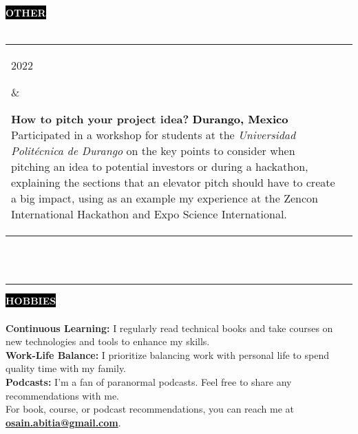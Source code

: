 \documentclass[10pt,A4]{article}
\makeatletter
\newcounter{a}
\newcounter{b}
\newcounter{c}
\newcommand{\cvsection}[1] {
	\textcolor{white}{\MakeUppercase{\textbf{#1}}}
}
\newcommand{\cvsect}[1]{
	\colorbox{black}{{\cvsection{#1}}}\\\\%
}
\newenvironment{entrylist}{%
	\begin{tabular*}{\textwidth}[t]{@{\extracolsep{\fill}}ll}
	}{%
	\end{tabular*}
}
\newcommand{\entry}[4]{%
	\parbox[t]{3.5cm}{%
		#1%
	}%
	&\parbox[t]{14cm}{%
		\textbf{#2}%
		\hfill%
		{\footnotesize \textbf{\textcolor{black}{#3}}}\\%
		#4%
	}\\\\}
\makeatother
\begin{document}
	\cvsect{Other}
	\begin{entrylist}
		\entry
		{2022}
		{How to pitch your project idea?}
		{Durango, Mexico}
		{Participated in a workshop for students at the \textit{Universidad Politécnica de Durango} on the key points
		to consider when pitching an idea to potential investors or during a hackathon, explaining the
		sections that an elevator pitch should have to create a big impact, using as an example my experience
		at the Zencon International Hackathon and Expo Science International.}
		\entry
		{2020}
		{Volunteer at World Sustainable Development Forum}
		{Durango, Mexico}
		{Translator for the speakers at the World Sustainable Development Forum, translating from English to Spanish
		and vice versa during the 3 days the event lasted. This forum had as its main objective to discuss climate
		change to encourage the citizens to take action against it.}
	\end{entrylist}%
	\\\\

	
	
	\begin{minipage}[t]{0.5\textwidth}\hrule height 0pt width 0pt%
		\cvsect{Hobbies}
		{\textbf{Continuous Learning:} I regularly read technical books and take courses on new technologies and tools to enhance my skills.}\\
		{\textbf{Work-Life Balance:} I prioritize balancing work with personal life to spend quality time with my family.}\\
		{\textbf{Podcasts:} I'm a fan of paranormal podcasts. Feel free to share any recommendations with me.}\\
		\hfil\break
		{For book, course, or podcast recommendations, you can reach me at \href{mailto:osain.abitia@gmail.com}{\textbf{osain.abitia@gmail.com}}.}\\

	\end{minipage}%
	
\end{document}
